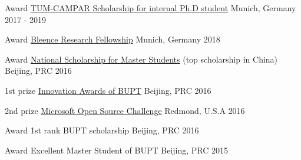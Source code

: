 




\begin{cvhonors}

\cvhonor
{Award} %
{\href{}{TUM-CAMPAR Scholarship for internal Ph.D student} } %
{Munich, Germany} %
{2017 - 2019} %

\cvhonor
{Award} %
{\href{https://bleenco.com/}{Bleence Research Fellowship} } %
{Munich, Germany} %
{2018} %

\cvhonor
{Award} %
{\href{http://sice.bupt.edu.cn/info/1008/1546.htm}{National Scholarship for Master Students} (top scholarship in China)} %
{Beijing, PRC} %
{2016} %

\cvhonor
{1st prize} %
{\href{http://my.bupt.edu.cn/detach.portal?.pmn=view&action=browser&.ia=false&.pen=pe1144&bulletinId=fc089be9-6d81-11e6-ae27-4f4915a784ea}{Innovation Awards of BUPT}} %
{Beijing, PRC} %
{2016} %


\cvhonor
{2nd prize} %
{\href{https://www.microsoft.com/en-us/research/academic-program/microsoft-open-source-challenge/}{Microsoft Open Source Challenge}} %
{Redmond, U.S.A} %
{2016} %


\cvhonor
{Award} %
{1st rank BUPT scholarship} %
{Beijing, PRC} %
{2016} %

\cvhonor
{Award} %
{Excellent Master Student of BUPT} %
{Beijing, PRC} %
{2015} %


\end{cvhonors}
